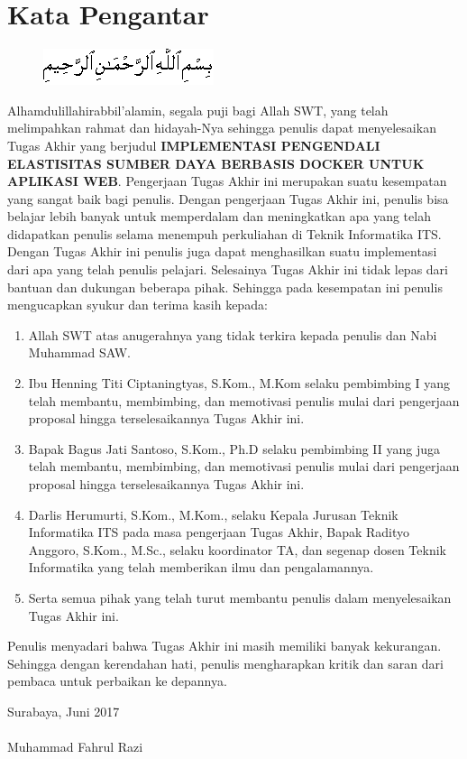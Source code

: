 \chapter{Kata Pengantar}
		\begin{figure}[h]
			\centering
			\includegraphics[width=0.5\linewidth]{img/bismillah.png}
		\end{figure}

		Alhamdulillahirabbil’alamin, segala puji bagi Allah SWT, yang telah melimpahkan rahmat dan hidayah-Nya sehingga penulis dapat menyelesaikan Tugas Akhir yang berjudul \textbf{IMPLEMENTASI PENGENDALI ELASTISITAS SUMBER DAYA BERBASIS DOCKER UNTUK APLIKASI WEB}. Pengerjaan Tugas Akhir ini merupakan suatu kesempatan yang sangat baik bagi penulis. Dengan pengerjaan Tugas Akhir ini, penulis bisa belajar lebih banyak untuk memperdalam dan meningkatkan apa yang telah didapatkan penulis selama menempuh perkuliahan di Teknik Informatika ITS. Dengan Tugas Akhir ini penulis juga dapat menghasilkan suatu implementasi dari apa yang telah penulis pelajari.
		Selesainya Tugas Akhir ini tidak lepas dari bantuan dan dukungan beberapa pihak. Sehingga pada kesempatan ini penulis mengucapkan syukur dan terima kasih kepada:
		\begin{enumerate}
			\item Allah SWT atas anugerahnya yang tidak terkira kepada penulis dan Nabi Muhammad SAW.
			\item Ibu Henning Titi Ciptaningtyas, S.Kom., M.Kom selaku pembimbing I yang telah membantu, membimbing, dan memotivasi penulis mulai dari pengerjaan proposal hingga terselesaikannya Tugas Akhir ini.
			\item Bapak Bagus Jati Santoso, S.Kom., Ph.D selaku pembimbing II yang juga telah membantu, membimbing, dan memotivasi penulis mulai dari pengerjaan proposal hingga terselesaikannya Tugas Akhir ini.
			\item Darlis Herumurti, S.Kom., M.Kom., selaku Kepala Jurusan Teknik Informatika ITS pada masa pengerjaan Tugas Akhir, Bapak Radityo Anggoro, S.Kom., M.Sc., selaku koordinator TA, dan segenap dosen Teknik Informatika yang telah memberikan ilmu dan pengalamannya.
			\item Serta semua pihak yang telah turut membantu penulis dalam menyelesaikan Tugas Akhir ini.
		\end{enumerate}

		Penulis menyadari bahwa Tugas Akhir ini masih memiliki banyak kekurangan. Sehingga dengan kerendahan hati, penulis mengharapkan kritik dan saran dari pembaca untuk perbaikan ke depannya.

		\hfill Surabaya, Juni 2017 \\ \\
		\hfill Muhammad Fahrul Razi